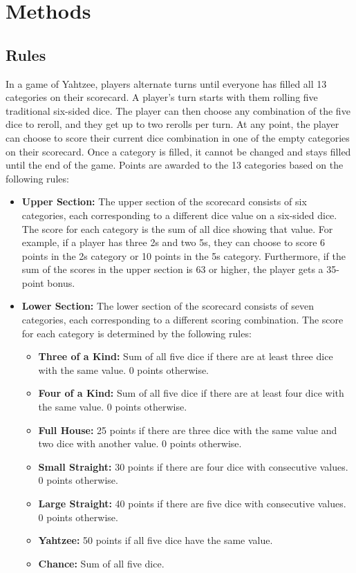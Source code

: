 \documentclass[12pt]{article}
\begin{document}
\section{Methods}

\subsection{Rules}

In a game of Yahtzee, players alternate turns until everyone has filled all 13 categories on their scorecard. A player's turn starts with them rolling five traditional six-sided dice. The player can then choose any combination of the five dice to reroll, and they get up to two rerolls per turn. At any point, the player can choose to score their current dice combination in one of the empty categories on their scorecard. Once a category is filled, it cannot be changed and stays filled until the end of the game. Points are awarded to the 13 categories based on the following rules:

\begin{itemize}
    \item \textbf{Upper Section:} The upper section of the scorecard consists of six categories, each corresponding to a different dice value on a six-sided dice. The score for each category is the sum of all dice showing that value. For example, if a player has three 2s and two 5s, they can choose to score 6 points in the 2s category or 10 points in the 5s category. Furthermore, if the sum of the scores in the upper section is 63 or higher, the player gets a 35-point bonus.
    \item \textbf{Lower Section:} The lower section of the scorecard consists of seven categories, each corresponding to a different scoring combination. The score for each category is determined by the following rules:
    \begin{itemize}
        \item \textbf{Three of a Kind:} Sum of all five dice if there are at least three dice with the same value. 0 points otherwise.
        \item \textbf{Four of a Kind:} Sum of all five dice if there are at least four dice with the same value. 0 points otherwise.
        \item \textbf{Full House:} 25 points if there are three dice with the same value and two dice with another value. 0 points otherwise.
        \item \textbf{Small Straight:} 30 points if there are four dice with consecutive values. 0 points otherwise.
        \item \textbf{Large Straight:} 40 points if there are five dice with consecutive values. 0 points otherwise.
        \item \textbf{Yahtzee:} 50 points if all five dice have the same value.
        \item \textbf{Chance:} Sum of all five dice.
    \end{itemize}
\end{itemize}
\end{document}
